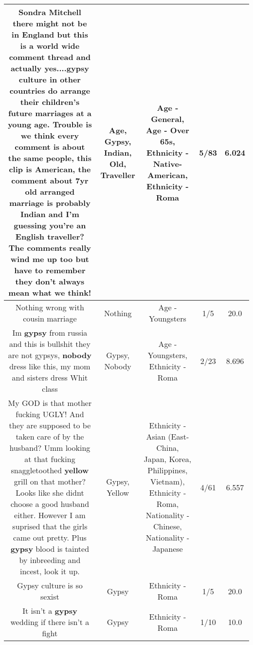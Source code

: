 \documentclass[11pt]{article}
\newlength\mylength
\begin{document}
\begin{center}
\begin{longtable}{|C{.65\mylength}|C{.30\mylength}|C{.12\mylength}|C{.12\mylength}|C{.12\mylength}|}
  \small Sondra Mitchell there might not be in England but this is a world wide comment thread and actually yes....\textbf{gypsy} culture in other countries do arrange their children's future marriages at a young \textbf{age}. Trouble is we think every comment is about the same people, this clip is American, the comment about 7yr \textbf{old} arranged marriage is probably \textbf{Indian} and I'm guessing you're an English \textbf{traveller}? The comments really wind me up too but have to remember they don't always mean what we think!\normalsize   & Age, Gypsy, Indian, Old, Traveller & Age - General, Age - Over 65s, Ethnicity - Native-American, Ethnicity - Roma & 5/83 & 6.024 \\  \hline
  \small Nothing wrong with cousin marriage\normalsize   & Nothing & Age - Youngsters & 1/5 & 20.0 \\  \hline
  \small Im \textbf{gypsy} from russia and this is bullshit they are not gypsys, \textbf{nobody} dress like this, my mom and sisters dress Whit class\normalsize   & Gypsy, Nobody & Age - Youngsters, Ethnicity - Roma & 2/23 & 8.696 \\  \hline
  \small My GOD is that mother fucking UGLY! And they are supposed to be taken care of by the husband? Umm looking at that fucking snaggletoothed \textbf{y\textbf{e\textbf{llow}}} grill on that mother? Looks like she didnt choose a good husband either. However I am suprised that the girls came out pretty. Plus \textbf{gypsy} blood is tainted by inbreeding and incest, look it up.\normalsize   & Gypsy, Yellow & Ethnicity - Asian (East- China, Japan, Korea, Philippines, Vietnam), Ethnicity - Roma, Nationality - Chinese, Nationality - Japanese & 4/61 & 6.557 \\  \hline
  \small Gypsy culture is so sexist\normalsize   & Gypsy & Ethnicity - Roma & 1/5 & 20.0 \\  \hline
  \small It isn't a \textbf{gypsy} wedding if there isn't a fight\normalsize   & Gypsy & Ethnicity - Roma & 1/10 & 10.0 \\  \hline

\end{longtable}
\end{center}
\end{document}
